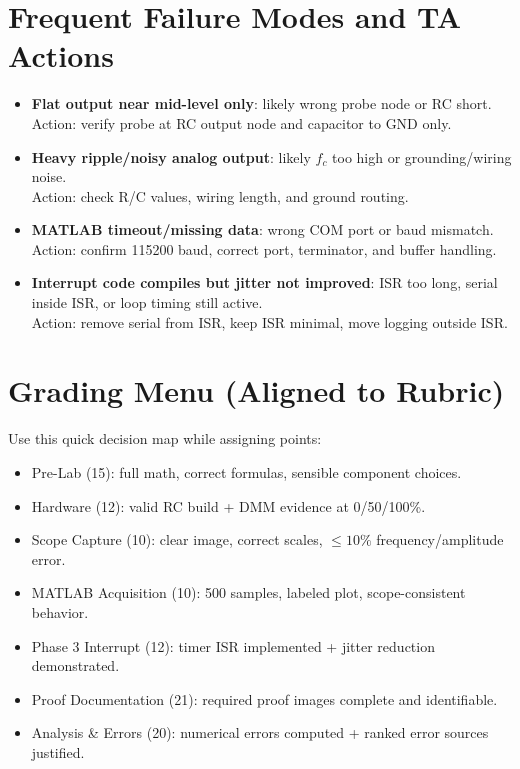 \documentclass[11pt,letterpaper]{article}
\begin{document}
\section{Frequent Failure Modes and TA Actions}
\begin{itemize}[leftmargin=1.2em]
    \item \textbf{Flat output near mid-level only}: likely wrong probe node or RC short.\\
    Action: verify probe at RC output node and capacitor to GND only.
    \item \textbf{Heavy ripple/noisy analog output}: likely $f_c$ too high or grounding/wiring noise.\\
    Action: check R/C values, wiring length, and ground routing.
    \item \textbf{MATLAB timeout/missing data}: wrong COM port or baud mismatch.\\
    Action: confirm 115200 baud, correct port, terminator, and buffer handling.
    \item \textbf{Interrupt code compiles but jitter not improved}: ISR too long, serial inside ISR, or loop timing still active.\\
    Action: remove serial from ISR, keep ISR minimal, move logging outside ISR.
\end{itemize}

\section{Grading Menu (Aligned to Rubric)}
Use this quick decision map while assigning points:
\begin{itemize}[leftmargin=1.2em]
    \item Pre-Lab (15): full math, correct formulas, sensible component choices.
    \item Hardware (12): valid RC build + DMM evidence at 0/50/100\%.
    \item Scope Capture (10): clear image, correct scales, $\le 10\%$ frequency/amplitude error.
    \item MATLAB Acquisition (10): 500 samples, labeled plot, scope-consistent behavior.
    \item Phase 3 Interrupt (12): timer ISR implemented + jitter reduction demonstrated.
    \item Proof Documentation (21): required proof images complete and identifiable.
    \item Analysis \& Errors (20): numerical errors computed + ranked error sources justified.
\end{itemize}
\end{document}
